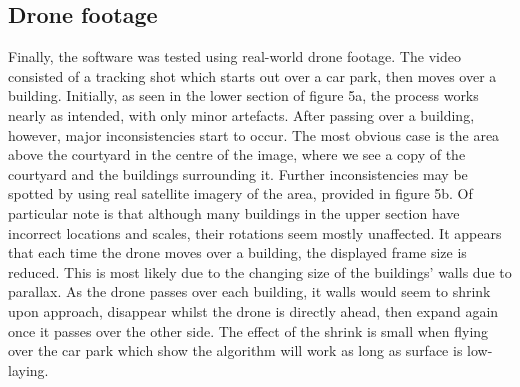 \subsection{Drone footage}

Finally, the software was tested using real-world drone footage.
The video consisted of a tracking shot which starts out over a car park, then moves over a building.
Initially, as seen in the lower section of figure 5a, the process works nearly as intended,
with only minor artefacts.
After passing over a building, however, major inconsistencies start to occur.
The most obvious case is the area above the courtyard in the centre of the image,
where we see a copy of the courtyard and the buildings surrounding it.
Further inconsistencies may be spotted by using real satellite imagery of the area, provided in figure 5b.
Of particular note is that although many buildings in the upper section have incorrect locations and scales,
their rotations seem mostly unaffected.
It appears that each time the drone moves over a building, the displayed frame size is reduced.
This is most likely due to the changing size of the buildings' walls due to parallax.
As the drone passes over each building, it walls would seem to shrink upon approach, disappear whilst the drone is directly ahead, then expand again once it passes over the other side.
The effect of the shrink is small when flying over the car park which show the algorithm will work as long as surface is low-laying.
